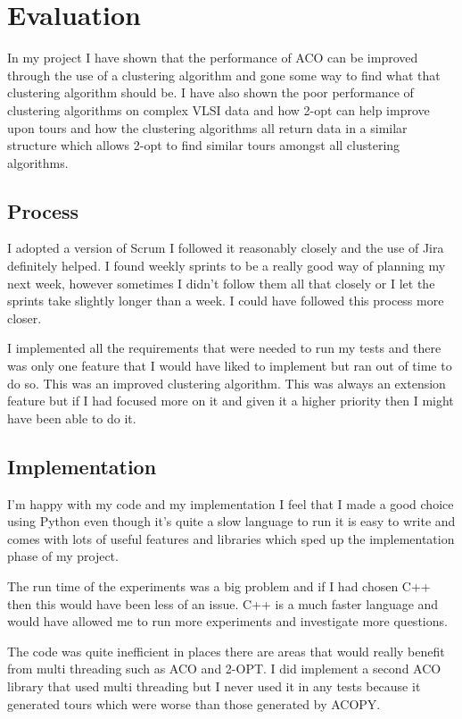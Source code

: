 \chapter{Evaluation}

In my project I have shown that the performance of ACO can be improved through the use of a clustering algorithm and gone some way to find what that clustering algorithm should be. I have also shown the poor performance of clustering algorithms on complex VLSI data and how 2-opt can help improve upon tours and how the clustering algorithms all return data in a similar structure which allows 2-opt to find similar tours amongst all clustering algorithms.

\section{Process}

I adopted a version of Scrum I followed it reasonably closely and the use of Jira definitely helped. I found weekly sprints to be a really good way of planning my next week, however sometimes I didn't follow them all that closely or I let the sprints take slightly longer than a week. I could have followed this process more closer. 

I implemented all the requirements that were needed to run my tests and there was only one feature that I would have liked to implement but ran out of time to do so. This was an improved clustering algorithm. This was always an extension feature but if I had focused more on it and given it a higher priority then I might have been able to do it. 

\section{Implementation}

I'm happy with my code and my implementation I feel that I made a good choice using Python even though it's quite a slow language to run it is easy to write and comes with lots of useful features and libraries which sped up the implementation phase of my project.

The run time of the experiments was a big problem and if I had chosen C++ then this would have been less of an issue. C++ is a much faster language and would have allowed me to run more experiments and investigate more questions.

The code was quite inefficient in places there are areas that would really benefit from multi threading such as ACO and 2-OPT. I did implement a second ACO library that used multi threading but I never used it in any tests because it generated tours which were worse than those generated by ACOPY.

